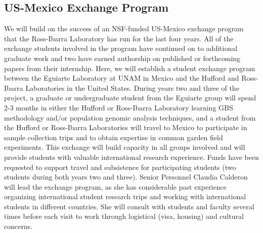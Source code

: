 \subsection*{US-Mexico Exchange Program}
We will build on the success of an NSF-funded US-Mexico exchange program that the Ross-Ibarra Laboratory has run for the last four years.  
All of the exchange students involved in the program have continued on to additional graduate work and two have earned authorship on published or forthcoming papers from their internship.  
Here, we will establish a student exchange program between the Eguiarte Laboratory at UNAM in Mexico and the Hufford and Ross-Ibarra Laboratories in the United States.
During years two and three of the project, a graduate or undergraduate student from the Eguiarte group will spend 2-3 months in either the Hufford or Ross-Ibarra Laboratory learning GBS methodology and/or population genomic analysis techniques, and a student from the Hufford or Ross-Ibarra Laboratories will travel to Mexico to participate in sample collection trips and to obtain expertise in common garden field experiments. 
This exchange will build capacity in all groups involved and will provide students with valuable international research experience. 
Funds have been requested to support travel and subsistence for participating students (two students during both years two and three).
Senior Personnel Claudia Calderon will lead the exchange program, as she has considerable past experience organizing international student research trips and working with international students in different countries.
She will consult with students and faculty several times before each visit to work through logistical (visa, housing) and cultural concerns.




